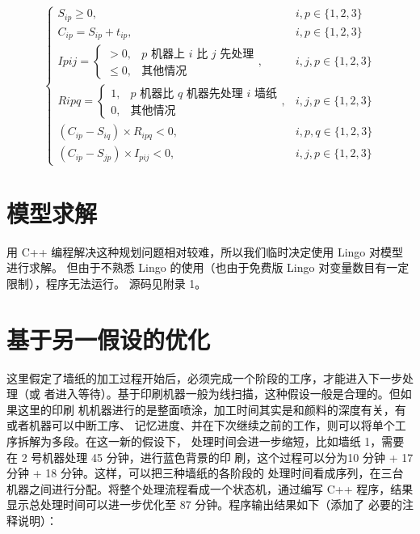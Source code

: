 \documentclass[bwprint]{cumcmthesis}    %
\begin{document}
$$
\begin{cases}
    S_{ip} \ge 0,                                                       & i,p \in \{1,2,3\} \\
    C_{ip} = S_{ip} + t_{ip},                                           & i,p \in \{1,2,3\} \\
    I{pij} =    \begin{cases}
                    >   0,  & \text{$p$ 机器上 $i$ 比 $j$ 先处理} \\
                    \le 0,  & \text{其他情况}
                \end{cases},                                            & i,j,p \in \{1,2,3\} \\
    R{ipq} =    \begin{cases}
                    1,      & \text{$p$ 机器比 $q$ 机器先处理 $i$ 墙纸} \\
                    0,      & \text{其他情况}
                \end{cases},                                            & i,j,p \in \{1,2,3\} \\
    \left(C_{ip}-S_{iq}\right) \times R_{ipq}<0,                        & i,p,q \in \{1,2,3\} \\
    \left(C_{ip}-S_{jp}\right) \times I_{pij}<0,                        & i,j,p \in \{1,2,3\}
\end{cases}
$$

\section{模型求解}

用 C++ 编程解决这种规划问题相对较难，所以我们临时决定使用 Lingo 对模型进行求解。
但由于不熟悉 Lingo 的使用（也由于免费版 Lingo 对变量数目有一定限制），程序无法运行。
源码见附录 1。

\section{基于另一假设的优化}

这里假定了墙纸的加工过程开始后，必须完成一个阶段的工序，才能进入下一步处理（或
者进入等待）。基于印刷机器一般为线扫描，这种假设一般是合理的。但如果这里的印刷
机机器进行的是整面喷涂，加工时间其实是和颜料的深度有关，有或者机器可以中断工序、
记忆进度、并在下次继续之前的工作，则可以将单个工序拆解为多段。在这一新的假设下，
处理时间会进一步缩短，比如墙纸 1，需要在 2 号机器处理 45 分钟，进行蓝色背景的印
刷，这个过程可以分为10 分钟 + 17 分钟 + 18 分钟。这样，可以把三种墙纸的各阶段的
处理时间看成序列，在三台机器之间进行分配。将整个处理流程看成一个状态机，通过编写
C++ 程序，结果显示总处理时间可以进一步优化至 87 分钟。程序输出结果如下（添加了
必要的注释说明）：
\end{document}
